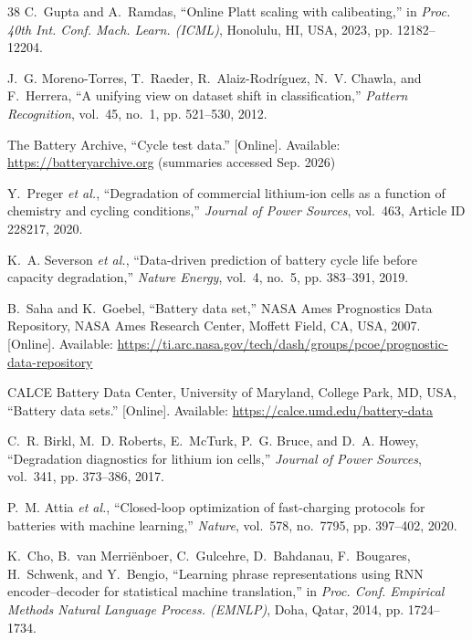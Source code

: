 \documentclass[11pt,a4paper]{article}
\begin{document}
\begin{thebibliography}{38}
C.~Gupta and A.~Ramdas, ``Online Platt scaling with calibeating,'' in \emph{Proc. 40th Int. Conf. Mach. Learn. (ICML)}, Honolulu, HI, USA, 2023, pp. 12182--12204.

J.~G. Moreno-Torres, T.~Raeder, R.~Alaiz-Rodr\'iguez, N.~V. Chawla, and F.~Herrera, ``A unifying view on dataset shift in classification,'' \emph{Pattern Recognition}, vol.~45, no.~1, pp. 521--530, 2012.

The Battery Archive, ``Cycle test data.'' [Online]. Available: \url{https://batteryarchive.org} (summaries accessed Sep. 2026)

Y.~Preger \emph{et al.}, ``Degradation of commercial lithium-ion cells as a function of chemistry and cycling conditions,'' \emph{Journal of Power Sources}, vol.~463, Article ID 228217, 2020.

K.~A. Severson \emph{et al.}, ``Data-driven prediction of battery cycle life before capacity degradation,'' \emph{Nature Energy}, vol.~4, no.~5, pp. 383--391, 2019.

B.~Saha and K.~Goebel, ``Battery data set,'' NASA Ames Prognostics Data Repository, NASA Ames Research Center, Moffett Field, CA, USA, 2007. [Online]. Available: \url{https://ti.arc.nasa.gov/tech/dash/groups/pcoe/prognostic-data-repository}

CALCE Battery Data Center, University of Maryland, College Park, MD, USA, ``Battery data sets.'' [Online]. Available: \url{https://calce.umd.edu/battery-data}

C.~R. Birkl, M.~D. Roberts, E.~McTurk, P.~G. Bruce, and D.~A. Howey, ``Degradation diagnostics for lithium ion cells,'' \emph{Journal of Power Sources}, vol.~341, pp. 373--386, 2017.

P.~M. Attia \emph{et al.}, ``Closed-loop optimization of fast-charging protocols for batteries with machine learning,'' \emph{Nature}, vol.~578, no.~7795, pp. 397--402, 2020.

K.~Cho, B.~van Merri\"enboer, C.~Gulcehre, D.~Bahdanau, F.~Bougares, H.~Schwenk, and Y.~Bengio, ``Learning phrase representations using RNN encoder--decoder for statistical machine translation,'' in \emph{Proc. Conf. Empirical Methods Natural Language Process. (EMNLP)}, Doha, Qatar, 2014, pp. 1724--1734.


\end{thebibliography}
\end{document}
